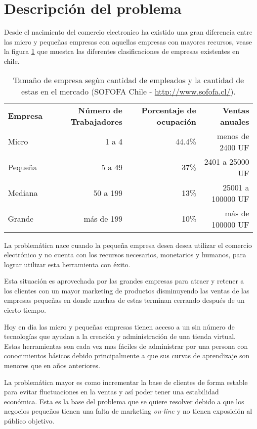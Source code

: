 \section{Descripción del problema}

Desde el nacimiento del comercio electronico ha existido una gran diferencia
entre las micro y pequeñas empresas con aquellas empresas con mayores recursos,
vease la figura \ref{tab:tam_empresa} que muestra las diferentes clasificaciones
de empresas existentes en chile.

\begin{table}[h]
\centering
\begin{tabular}{lrrr}
{\bf Empresa}  & {\bf Número de Trabajadores} & {\bf Porcentaje de ocupación} & {\bf Ventas anuales}\\
Micro    & 1 a 4                & 44.4\%  & menos de 2400 UF\\
Pequeña  & 5 a 49               & 37\%  & 2401 a 25000 UF\\
Mediana  & 50 a 199             & 13\%  & 25001 a 100000 UF\\
Grande   & más de 199           & 10\%  & más de 100000 UF\\
\end{tabular}
\caption[TamañoEmpresa]{Tamaño de empresa segùn cantidad de empleados y
la cantidad de estas en el mercado (SOFOFA Chile - \url{http://www.sofofa.cl/}).}
\label{tab:tam_empresa}
\end{table}


La problemática nace cuando la pequeña empresa desea desea utilizar el comercio
electrónico y no cuenta con los recursos necesarios, monetarios y humanos,
para lograr utilizar esta herramienta con éxito.

Esta situación es aprovechada por las grandes empresas para atraer y retener a los
clientes con un mayor marketing de productos disminuyendo las ventas de las
empresas pequeñas en donde muchas de estas terminan cerrando después de un cierto
tiempo.

Hoy en día las micro y pequeñas empresas tienen acceso a un sin número de
tecnologías que ayudan a la creación y administración de una tienda virtual.
Estas herramientas son cada vez mas fáciles de administrar por una persona
con conocimientos básicos debido principalmente a que sus curvas de aprendizaje
son menores que en años anteriores.

La problemática mayor es como incrementar la base de clientes de forma estable
para evitar fluctuaciones en la ventas y así poder tener una estabilidad económica.
Esta es la base del problema que se quiere resolver debido a que los negocios
pequeños tienen una falta de marketing \emph{on-line} y no tienen exposición al público
objetivo.

